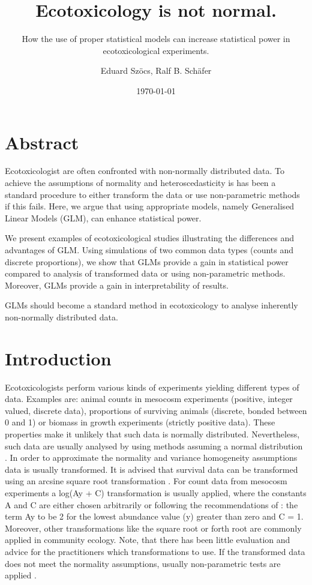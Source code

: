 \documentclass{scrartcl}
\title{Ecotoxicology is not normal.}
\subtitle{How the use of proper statistical models can increase statistical power in ecotoxicological experiments.}
\author{Eduard Szöcs, Ralf B. Schäfer}
\date{\today}
\begin{document}
\maketitle

\section*{Abstract}
Ecotoxicologist are often confronted with non-normally distributed data.
To achieve the assumptions of normality and heteroscedasticity is has been a standard procedure to either transform the data or use non-parametric methods if this fails.
Here, we argue that using appropriate models, namely Generalised Linear Models (GLM), can enhance statistical power.

We present examples of ecotoxicological studies illustrating the differences and advantages of GLM.
Using simulations of two common data types (counts and discrete proportions), we show that GLMs provide a gain in statistical power compared to analysis of transformed data or using non-parametric methods.
Moreover, GLMs provide a gain in interpretability of results.

GLMs should become a standard method in ecotoxicology to analyse inherently non-normally distributed data.




\section{Introduction}
\label{sec:intro}
Ecotoxicologists perform various kinds of experiments yielding different types of data.
Examples are: animal counts in mesocosm experiments (positive, integer valued, discrete data), proportions of surviving animals (discrete, bonded between 0 and 1) or biomass in growth experiments (strictly positive data).
These properties make it unlikely that such data is normally distributed. 
Nevertheless, such data are usually analysed by using methods assuming a normal distribution \citep{wang_making_2011}. 
In order to approximate the normality and variance homogeneity assumptions data is usually transformed.
It is advised that survival data can be transformed using an arcsine square root transformation \citep{oecd_current_2006, newman_quantitative_2012}. 
For count data from mesocosm experiments a log(Ay + C) transformation is usually applied, where the constants A and C are either chosen arbitrarily or following the recommendations of \citet{van_den_brink_impact_2000}: the term Ay to be 2 for the lowest abundance value (y) greater than zero and C = 1. 
Moreover, other transformations like the square root or forth root are commonly applied in community ecology.
Note, that there has been little evaluation and advice for the practitioners which transformations to use.
If the transformed data does not meet the normality assumptions, usually non-parametric tests are applied \citep{wang_making_2011}.
\end{document}
